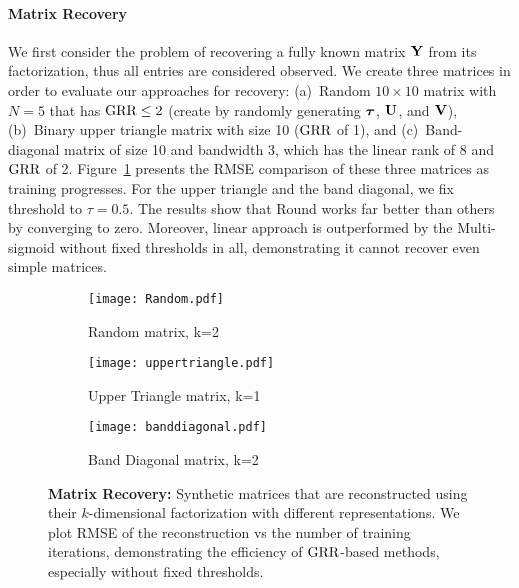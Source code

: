\documentclass{article}
\newcommand{\sameer}[1]{\todo[color=blue!20]{\textbf{s:} #1}{}}
\begin{document}
\paragraph{Matrix Recovery}
We first consider the problem of recovering a fully known matrix $\mathbf{Y}$ from its factorization, thus all entries are considered observed. 
We create three matrices in order to evaluate our approaches for recovery:
(a)~Random $10\times10$ matrix with $N=5$ that has $\text{GRR}\leq 2$ (create by randomly generating ${\boldsymbol{\tau}}$, $\mathbf{U}$, and $\mathbf{V}$),
(b)~Binary upper triangle matrix with size 10 ($\text{GRR}$ of 1), and 
(c)~Band-diagonal matrix of size 10 and bandwidth 3, which has the linear rank of $8$ and $\text{GRR}$ of 2.
%
Figure~\ref{fig:fullrec} presents the RMSE comparison of these three matrices as training progresses. For the upper triangle and the band diagonal, we fix threshold to $\tau=0.5$. The results show that Round works far better than others by converging to zero.  Moreover, linear approach is outperformed by the Multi-sigmoid without fixed thresholds in all, demonstrating it cannot recover even simple matrices. %


\begin{figure*}[tb]
	\centering
	\begin{subfigure}{0.31\textwidth}
	  \centering
	  \texttt{[image: Random.pdf]}
	  \caption{Random matrix, k=2}
		\end{subfigure}
		\quad
		\begin{subfigure}{0.31\textwidth}
	  	\centering
	  	\texttt{[image: uppertriangle.pdf]}
	  	\caption{Upper Triangle matrix, k=1}
		\end{subfigure}
		\quad
		\begin{subfigure}{0.31\textwidth}
	  \centering
	  \texttt{[image: banddiagonal.pdf]}
	  \caption{Band Diagonal matrix, k=2}
	\end{subfigure}
	\caption{\textbf{Matrix Recovery:} Synthetic matrices that are reconstructed using their $k$-dimensional factorization with different representations. We plot RMSE of the reconstruction vs the number of training iterations, demonstrating the efficiency of $\text{GRR}$-based methods, especially without fixed thresholds.}
	\label{fig:fullrec}
\end{figure*}
\end{document}
